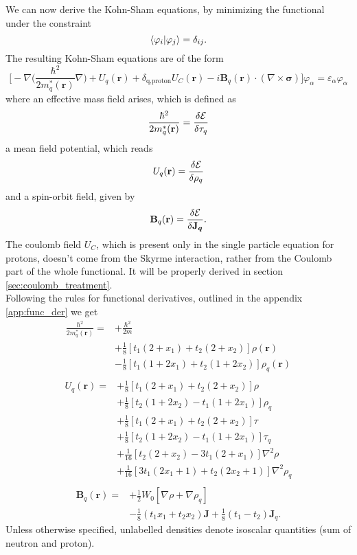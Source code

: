 We can now derive the Kohn-Sham equations, by minimizing the functional under the constraint
\begin{equation}
    \label{eq:spe_ks_constraint}
    \bra{\varphi_i}\ket{\varphi_j}=\delta_{ij}.
\end{equation}
The resulting Kohn-Sham equations are of the form
\begin{equation}
    \label{eq:spe_ks}
    \bigg[-\nabla\bigg(\frac{\hbar^2}{2m^{*}_q(\mathbf r)}\nabla \bigg) + U_q(\mathbf r) + \delta_{\text{q,proton}}U_C(\mathbf r)-i\mathbf B_q(\mathbf r)\cdot(\nabla \times \boldsymbol\sigma) \bigg]\varphi_\alpha=\varepsilon_\alpha\varphi_\alpha
\end{equation}
where an effective mass field arises, which is defined as
\begin{equation}
    \frac{\hbar^2}{2m^{*}_q(\mathbf r)} = \fdv{\mathcal E}{\tau_q}
\end{equation}
a mean field potential, which reads
\begin{equation}
    U_q(\mathbf r) = \fdv{\mathcal E}{\rho_q}\label{eq:fdv_rho_skyrme}
\end{equation}
and a spin-orbit field, given by
\begin{equation}
    \mathbf B_q(\mathbf r) = \fdv{\mathcal E}{\boldsymbol{\mathbf J_q}}.
\end{equation}
The coulomb field $U_C$, which is present only in the single particle equation for protons, doesn't come from the Skyrme interaction, rather from the Coulomb part of the whole functional. It will be properly derived in section \ref{sec:coulomb_treatment}.
\\Following the rules for functional derivatives, outlined in the appendix \ref{app:func_der} we get
\begin{align}
    \frac{\hbar^2}{2m_q^*(\mathbf r)} =& +\frac{\hbar^2}{2m} \nonumber
    \\&+ \frac 1 8 [t_1(2+x_1)+t_2(2+x_2)]\rho(\mathbf r) \nonumber
    \\&- \frac 1 8 [t_1(1+2x_1)+t_2(1+2x_2)]\rho_q(\mathbf r ) \\\nonumber
\end{align}
\begin{align}
    U_q(\mathbf r) =& +\frac 1 8 [t_1(2+x_1)+t_2(2+x_2)]\rho \nonumber
    \\&+ \frac 1 8 [t_2(1+2x_2)-t_1(1+2x_1)]\rho_q \nonumber
    \\&+ \frac 1 8 [t_1(2+x_1)+t_2(2+x_2)]\tau \nonumber
    \\&+ \frac 1 8 [t_2(1+2x_2)-t_1(1+2x_1)]\tau_q \nonumber
    \\
    &+ \frac 1 {16} [t_2(2+x_2)-3t_1(2+x_1)] \nabla^2 \rho \nonumber
    \\&+ \frac 1 {16} [3t_1(2x_1+1)+t_2(2x_2+1)] \nabla^2 \rho_q \\\nonumber
\end{align}
\begin{align}
    \mathbf B_q (\mathbf r ) = &+\frac 1 2 W_0 [\nabla\rho + \nabla \rho_q] \nonumber\\
    &-\frac 1 8 (t_1 x_1 + t_2 x_2) \mathbf J + \frac 1 8 (t_1 - t_2) \mathbf J_q.
\end{align}
Unless otherwise specified, unlabelled densities denote isoscalar quantities (sum of neutron and proton).
